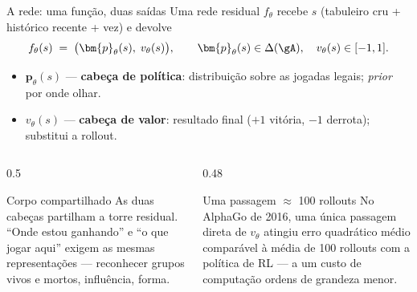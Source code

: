 \documentclass[aspectratio=169, 10pt]{beamer}
\newcommand{\redeval}{v_{\theta}}
\newcommand{\redepol}{\bm{p}_{\theta}}
\begin{document}
\begin{frame}{A rede: uma função, duas saídas}
  \small
  Uma rede residual $f_{\theta}$ recebe $s$ (tabuleiro cru + histórico recente + vez) e devolve
  \[
    f_{\theta}(s) \;=\; \bigl(\redepol(s),\; \redeval(s)\bigr),
    \qquad
    \redepol(s) \in \Delta(\gA),\quad \redeval(s) \in [-1,1].
  \]
  \begin{itemize}
    \item $\redepol(s)$ — \textbf{cabeça de política}: distribuição sobre as jogadas legais; \emph{prior} por onde olhar.
    \item $\redeval(s)$ — \textbf{cabeça de valor}: resultado final ($+1$ vitória, $-1$ derrota); substitui a rollout.
  \end{itemize}

  \begin{columns}[T]
    \begin{column}{0.5\textwidth}
      \begin{defbox}{Corpo compartilhado}
        As duas cabeças partilham a torre residual. ``Onde estou ganhando'' e
        ``o que jogar aqui'' exigem as mesmas representações — reconhecer grupos
        vivos e mortos, influência, forma.
      \end{defbox}
    \end{column}
    \begin{column}{0.48\textwidth}
      \begin{teobox}{Uma passagem $\approx$ 100 rollouts}
        No AlphaGo de 2016, uma única passagem direta de $\redeval$ atingiu erro
        quadrático médio comparável à média de 100 rollouts com a política de RL
        — a um custo de computação ordens de grandeza menor.
      \end{teobox}
    \end{column}
  \end{columns}
\end{frame}
\end{document}
